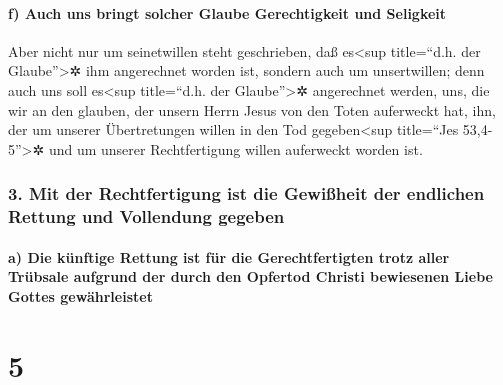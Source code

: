 \hypertarget{f-auch-uns-bringt-solcher-glaube-gerechtigkeit-und-seligkeit}{%
\paragraph{f) Auch uns bringt solcher Glaube Gerechtigkeit und
Seligkeit}\label{f-auch-uns-bringt-solcher-glaube-gerechtigkeit-und-seligkeit}}

 Aber nicht nur um seinetwillen steht geschrieben, daß
es\textless sup title=``d.h. der Glaube''\textgreater✲ ihm angerechnet
worden ist,  sondern auch um unsertwillen; denn auch uns
soll es\textless sup title=``d.h. der Glaube''\textgreater✲ angerechnet
werden, uns, die wir an den glauben, der unsern Herrn Jesus von den
Toten auferweckt hat,  ihn, der um unserer Übertretungen
willen in den Tod gegeben\textless sup title=``Jes 53,4-5''\textgreater✲
und um unserer Rechtfertigung willen auferweckt worden ist.

\hypertarget{mit-der-rechtfertigung-ist-die-gewiuxdfheit-der-endlichen-rettung-und-vollendung-gegeben}{%
\subsubsection{3. Mit der Rechtfertigung ist die Gewißheit der endlichen
Rettung und Vollendung
gegeben}\label{mit-der-rechtfertigung-ist-die-gewiuxdfheit-der-endlichen-rettung-und-vollendung-gegeben}}

\hypertarget{a-die-kuxfcnftige-rettung-ist-fuxfcr-die-gerechtfertigten-trotz-aller-truxfcbsale-aufgrund-der-durch-den-opfertod-christi-bewiesenen-liebe-gottes-gewuxe4hrleistet}{%
\paragraph{a) Die künftige Rettung ist für die Gerechtfertigten trotz
aller Trübsale aufgrund der durch den Opfertod Christi bewiesenen Liebe
Gottes
gewährleistet}\label{a-die-kuxfcnftige-rettung-ist-fuxfcr-die-gerechtfertigten-trotz-aller-truxfcbsale-aufgrund-der-durch-den-opfertod-christi-bewiesenen-liebe-gottes-gewuxe4hrleistet}}

\hypertarget{section-4}{%
\section{5}\label{section-4}}

